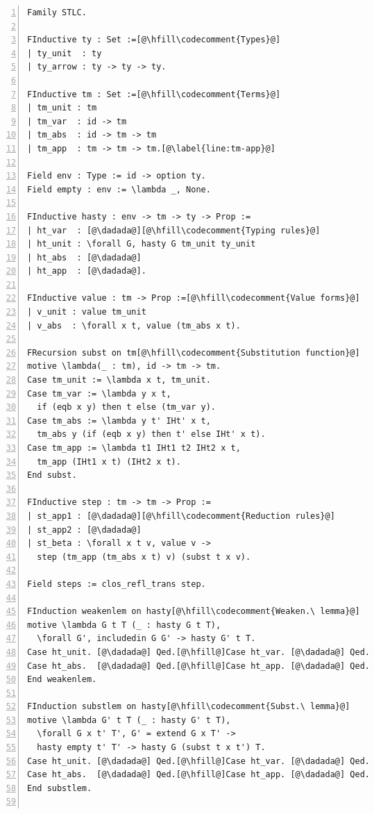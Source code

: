 \begin{figure}
\begin{minipage}{\textwidth}
\begin{multicols}{2}


\begin{lstlisting}[numbers=left]
Family STLC.

FInductive ty : Set :=[@\hfill\codecomment{Types}@]
| ty_unit  : ty
| ty_arrow : ty -> ty -> ty.

FInductive tm : Set :=[@\hfill\codecomment{Terms}@]
| tm_unit : tm
| tm_var  : id -> tm
| tm_abs  : id -> tm -> tm
| tm_app  : tm -> tm -> tm.[@\label{line:tm-app}@]

Field env : Type := id -> option ty.
Field empty : env := \lambda _, None.

FInductive hasty : env -> tm -> ty -> Prop :=
| ht_var  : [@\dadada@][@\hfill\codecomment{Typing rules}@]
| ht_unit : \forall G, hasty G tm_unit ty_unit
| ht_abs  : [@\dadada@]
| ht_app  : [@\dadada@].

FInductive value : tm -> Prop :=[@\hfill\codecomment{Value forms}@]
| v_unit : value tm_unit
| v_abs  : \forall x t, value (tm_abs x t).

FRecursion subst on tm[@\hfill\codecomment{Substitution function}@] 
motive \lambda(_ : tm), id -> tm -> tm.
Case tm_unit := \lambda x t, tm_unit.
Case tm_var := \lambda y x t,
  if (eqb x y) then t else (tm_var y).
Case tm_abs := \lambda y t' IHt' x t,
  tm_abs y (if (eqb x y) then t' else IHt' x t).
Case tm_app := \lambda t1 IHt1 t2 IHt2 x t,
  tm_app (IHt1 x t) (IHt2 x t).
End subst.

FInductive step : tm -> tm -> Prop :=
| st_app1 : [@\dadada@][@\hfill\codecomment{Reduction rules}@]
| st_app2 : [@\dadada@]
| st_beta : \forall x t v, value v ->
  step (tm_app (tm_abs x t) v) (subst t x v).

Field steps := clos_refl_trans step.

FInduction weakenlem on hasty[@\hfill\codecomment{Weaken.\ lemma}@]
motive \lambda G t T (_ : hasty G t T),
  \forall G', includedin G G' -> hasty G' t T.
Case ht_unit. [@\dadada@] Qed.[@\hfill@]Case ht_var. [@\dadada@] Qed.
Case ht_abs.  [@\dadada@] Qed.[@\hfill@]Case ht_app. [@\dadada@] Qed.
End weakenlem.

FInduction substlem on hasty[@\hfill\codecomment{Subst.\ lemma}@]
motive \lambda G' t T (_ : hasty G' t T),
  \forall G x t' T', G' = extend G x T' ->
  hasty empty t' T' -> hasty G (subst t x t') T.
Case ht_unit. [@\dadada@] Qed.[@\hfill@]Case ht_var. [@\dadada@] Qed.
Case ht_abs.  [@\dadada@] Qed.[@\hfill@]Case ht_app. [@\dadada@] Qed.
End substlem.


\end{lstlisting}
\end{multicols}
\end{minipage}
\end{figure}
